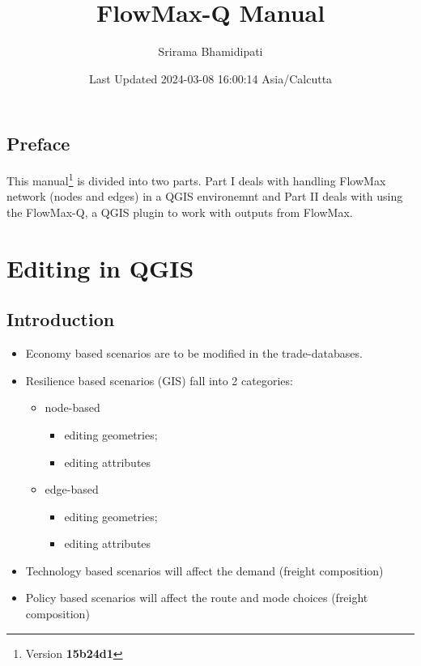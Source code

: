 \documentclass[
]{book}
\title{FlowMax-Q Manual}
\author{Srirama Bhamidipati}
\date{Last Updated 2024-03-08 16:00:14 Asia/Calcutta}
\providecommand{\tightlist}{%
  \setlength{\itemsep}{0pt}\setlength{\parskip}{0pt}}
\begin{document}
\maketitle

{
\setcounter{tocdepth}{1}
\tableofcontents
}
\chapter*{Preface}\label{preface}

This manual\footnote{Version \textbf{15b24d1}} is divided into two parts. Part I deals with handling FlowMax network (nodes and edges) in a QGIS environemnt and Part II deals with using the FlowMax-Q, a QGIS plugin to work with outputs from FlowMax.

\part{Editing in QGIS}\label{part-editing-in-qgis}

\chapter{Introduction}\label{introduction}

\begin{itemize}
\tightlist
\item
  Economy based scenarios are to be modified in the trade-databases.
\item
  Resilience based scenarios (GIS) fall into 2 categories:

  \begin{itemize}
  \tightlist
  \item
    node-based

    \begin{itemize}
    \tightlist
    \item
      editing geometries;
    \item
      editing attributes
    \end{itemize}
  \item
    edge-based

    \begin{itemize}
    \tightlist
    \item
      editing geometries;
    \item
      editing attributes
    \end{itemize}
  \end{itemize}
\item
  Technology based scenarios will affect the demand (freight composition)
\item
  Policy based scenarios will affect the route and mode choices (freight composition)
\end{itemize}
\end{document}
